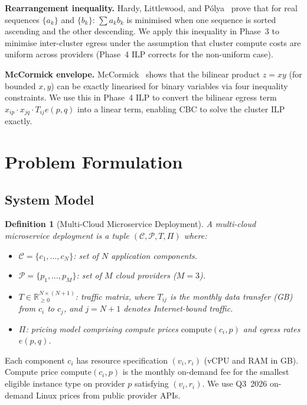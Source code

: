 \documentclass[10pt,journal]{IEEEtran}
\newtheorem{definition}{Definition}
\begin{document}
\textbf{Rearrangement inequality.}
Hardy, Littlewood, and P\'olya~\cite{hardy1952} prove that for real sequences
$\{a_k\}$ and $\{b_k\}$: $\sum a_k b_k$ is minimised when one sequence is
sorted ascending and the other descending.
We apply this inequality in Phase~3 to minimise inter-cluster egress under the
assumption that cluster compute costs are uniform across providers (Phase~4 ILP
corrects for the non-uniform case).

\textbf{McCormick envelope.}
McCormick~\cite{mccormick1976} shows that the bilinear product $z = xy$
(for bounded $x, y$) can be exactly linearised for binary variables via four
inequality constraints.
We use this in Phase~4 ILP to convert the bilinear egress term
$x_{ip} \cdot x_{jq} \cdot T_{ij} e(p,q)$ into a linear term, enabling
CBC to solve the cluster ILP exactly.

\section{Problem Formulation}\label{sec:problem}

\subsection{System Model}

\begin{definition}[Multi-Cloud Microservice Deployment]\label{def:system}
A multi-cloud microservice deployment is a tuple
$(\mathcal{C}, \mathcal{P}, T, \Pi)$ where:
\begin{itemize}[leftmargin=*,noitemsep]
  \item $\mathcal{C} = \{c_1,\ldots,c_N\}$: set of $N$ application components.
  \item $\mathcal{P} = \{p_1,\ldots,p_M\}$: set of $M$ cloud providers ($M=3$).
  \item $T \in \mathbb{R}_{\geq 0}^{N \times (N+1)}$: traffic matrix, where
    $T_{ij}$ is the monthly data transfer (GB) from $c_i$ to $c_j$, and
    $j=N+1$ denotes Internet-bound traffic.
  \item $\Pi$: pricing model comprising compute prices $\text{compute}(c_i, p)$
    and egress rates $e(p,q)$.
\end{itemize}
\end{definition}

Each component $c_i$ has resource specification $(v_i, r_i)$ (vCPU and RAM in GB).
Compute price $\text{compute}(c_i, p)$ is the monthly on-demand fee for the
smallest eligible instance type on provider $p$ satisfying $(v_i, r_i)$.
We use Q3~2026 on-demand Linux prices from public provider APIs.
\end{document}
